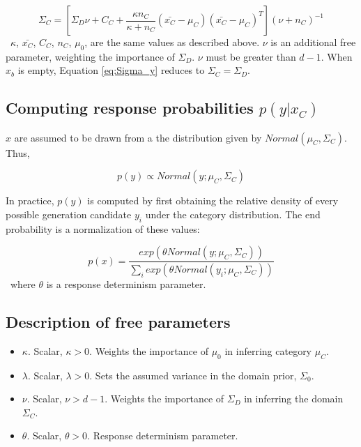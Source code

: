 \documentclass[12pt]{article}
\begin{document}
\begin{equation}
  \Sigma_C = [\Sigma_D\nu + C_C +
    \dfrac
    {\kappa n_C}
    {\kappa + n_C}
    (\bar{x_C}-\mu_C)(\bar{x_C}-\mu_C)^T
  ] (\nu + n_C)^{-1}
  \label{eq:Sigma_y}
\end{equation}
\
$\kappa$, $\bar{x_C}$, $C_C$, $n_C$, $\mu_0$,  are the same values as described above. $\nu$ is an additional free parameter, weighting the importance of $\Sigma_{D}$. $\nu$ must be greater than $d-1$. When $x_b$ is empty, Equation \ref{eq:Sigma_y} reduces to $\Sigma_C = \Sigma_D$.

\subsection*{Computing response probabilities $p(y | x_C)$}

$x$ are assumed to be drawn from a the distribution given by $Normal(\mu_{C}, \Sigma_{C})$. Thus, 


\begin{equation}
  p(y) \propto Normal(y; \mu_{C}, \Sigma_{C})
\end{equation}

In practice, $p(y)$ is computed by first obtaining the relative density of every possible generation candidate $y_i$ under the category distribution. The end probability is a normalization of these values:

\begin{equation}
  p(x) = \dfrac
    {exp( \theta Normal(y ; \mu_{C}, \Sigma_{C}))}
    {\sum_i exp( \theta Normal(y_i ; \mu_{C}, \Sigma_{C}))} 
\end{equation}
\
where $\theta$ is a response determinism parameter.

\subsection*{Description of free parameters}

\begin{itemize}
    \setlength\itemsep{-0.5em}
    \item $\kappa$. Scalar, $\kappa>0$. Weights the importance of $\mu_{0}$ in inferring category $\mu_{C}$.
    \item $\lambda$. Scalar, $\lambda>0$. Sets the assumed variance in the domain prior, $\Sigma_{0}$.
    \item $\nu$. Scalar, $\nu > d-1$. Weights the importance of $\Sigma_{D}$ in inferring the domain $\Sigma_{C}$.
    \item $\theta$. Scalar, $\theta > 0$. Response determinism parameter.
\end{itemize}
\end{document}

